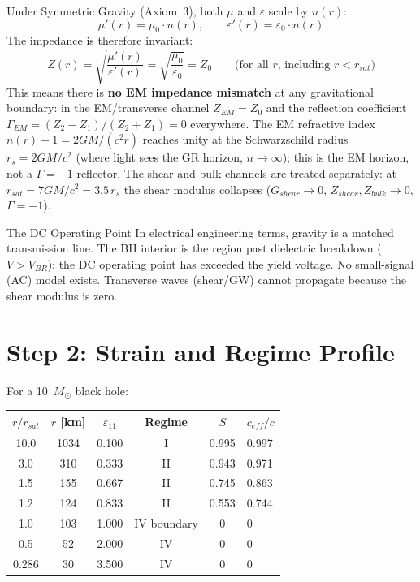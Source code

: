 Under Symmetric Gravity (Axiom~3), both $\mu$ and $\varepsilon$ scale by $n(r)$:
\begin{equation}
    \mu'(r) = \mu_0 \cdot n(r), \qquad \varepsilon'(r) = \varepsilon_0 \cdot n(r)
\end{equation}
The impedance is therefore invariant:
\begin{equation}
    Z(r) = \sqrt{\frac{\mu'(r)}{\varepsilon'(r)}} = \sqrt{\frac{\mu_0}{\varepsilon_0}} = Z_0
    \qquad \text{(for all $r$, including $r < r_{sat}$)}
\end{equation}
This means there is \textbf{no EM impedance mismatch} at any gravitational
boundary: in the EM/transverse channel $Z_{EM} = Z_0$ and the reflection
coefficient $\Gamma_{EM} = (Z_2 - Z_1)/(Z_2 + Z_1) = 0$ everywhere. The EM
refractive index $n(r) - 1 = 2GM/(c^2 r)$ reaches unity at the Schwarzschild
radius $r_s = 2GM/c^2$ (where light sees the GR horizon, $n \to \infty$); this
is the EM horizon, not a $\Gamma = -1$\gammaundeclared{} reflector. The shear and bulk channels
are treated separately: at $r_{sat} = 7GM/c^2 = 3.5\,r_s$ the shear modulus
collapses ($G_{shear} \to 0$, $Z_{shear}, Z_{bulk} \to 0$, $\Gamma = -1$\gammaundeclared{}).

\begin{resultbox}{The DC Operating Point}
In electrical engineering terms, gravity is a matched transmission line.
The BH interior is the region past dielectric breakdown ($V > V_{BR}$):
the DC operating point has exceeded the yield voltage.
No small-signal (AC) model exists. Transverse waves (shear/GW)
cannot propagate because the shear modulus is zero.
\end{resultbox}

\section{Step 2: Strain and Regime Profile}

For a 10~$M_\odot$ black hole:
\begin{center}
\begin{tabularx}{\textwidth}{@{}cccccX@{}}
\toprule
$r/r_{sat}$ & $r$ [km] & $\varepsilon_{11}$ & Regime & $S$ & $c_{eff}/c$ \\
\midrule
10.0  & 1034 & 0.100 & I  & 0.995 & 0.997 \\
3.0   & 310  & 0.333 & II & 0.943 & 0.971 \\
1.5   & 155  & 0.667 & II & 0.745 & 0.863 \\
1.2   & 124  & 0.833 & II & 0.553 & 0.744 \\
1.0   & 103  & 1.000 & IV boundary & 0 & 0 \\
0.5   & 52   & 2.000 & IV & 0 & 0 \\
0.286 & 30   & 3.500 & IV & 0 & 0 \\
\bottomrule
\end{tabularx}
\end{center}

